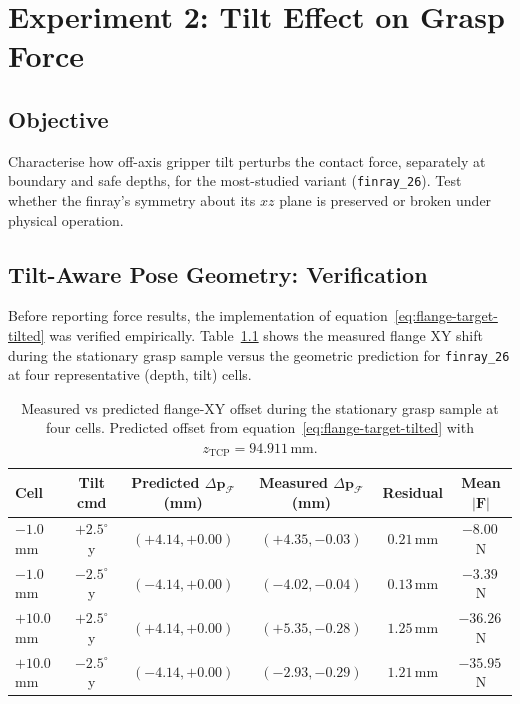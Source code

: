 \chapter{\rm\bfseries Experiment 2: Tilt Effect on Grasp Force}
\label{ch:exp2}

\section{Objective}

Characterise how off-axis gripper tilt perturbs the contact force, separately
at boundary and safe depths, for the most-studied variant
(\texttt{finray\_26}). Test whether the finray's symmetry about its $xz$
plane is preserved or broken under physical operation.

\section{Tilt-Aware Pose Geometry: Verification}
\label{sec:tilt-verify}

Before reporting force results, the implementation of
equation~\eqref{eq:flange-target-tilted} was verified empirically.
Table~\ref{tab:tilt-geometry} shows the measured flange XY shift during
the stationary grasp sample versus the geometric prediction for
\texttt{finray\_26} at four representative (depth, tilt) cells.

\begin{table}[ht]
\centering
\caption[Tilt geometry verification]{Measured vs predicted flange-XY offset
during the stationary grasp sample at four cells. Predicted offset from
equation~\eqref{eq:flange-target-tilted} with $z_{\text{TCP}} = 94.911$\,mm.}
\label{tab:tilt-geometry}
\small
\begin{tabular}{lccccc}
\toprule
Cell & Tilt cmd & Predicted $\Delta \mathbf{p}_\mathcal{F}$ (mm) &
       Measured $\Delta \mathbf{p}_\mathcal{F}$ (mm) & Residual & Mean $|\mathbf{F}|$ \\
\midrule
$-1.0$\,mm   & $+2.5^{\circ}$ y & $(+4.14, +0.00)$ & $(+4.35, -0.03)$ & $0.21$\,mm & $-8.00$\,N \\
$-1.0$\,mm   & $-2.5^{\circ}$ y & $(-4.14, +0.00)$ & $(-4.02, -0.04)$ & $0.13$\,mm & $-3.39$\,N \\
$+10.0$\,mm  & $+2.5^{\circ}$ y & $(+4.14, +0.00)$ & $(+5.35, -0.28)$ & $1.25$\,mm & $-36.26$\,N \\
$+10.0$\,mm  & $-2.5^{\circ}$ y & $(-4.14, +0.00)$ & $(-2.93, -0.29)$ & $1.21$\,mm & $-35.95$\,N \\
\bottomrule
\end{tabular}
\end{table}

